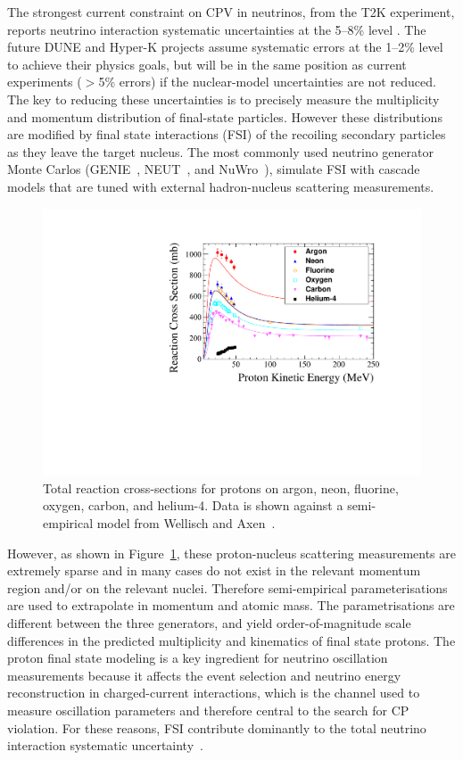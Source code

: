 The strongest current constraint on CPV in neutrinos, from the T2K experiment, reports neutrino interaction systematic uncertainties at the 5--8\% level \cite{Abe:2018wpn}.
The future DUNE and Hyper-K projects assume systematic errors at the 1--2\% level to achieve their physics goals, but will be in the same position as current experiments ($>$5\% errors) if the nuclear-model uncertainties are not reduced.  
The key to reducing these uncertainties is to precisely measure the multiplicity and momentum distribution of final-state particles. 
However these distributions are modified by final state interactions (FSI) of the recoiling secondary particles as they leave the target nucleus.  
The most commonly used neutrino generator Monte Carlos (GENIE~\cite{Andreopoulos:2009rq}, NEUT~\cite{Hayato:2009zz}, and NuWro~\cite{GOLAN2012499}), simulate FSI with cascade models that are tuned with external hadron-nucleus scattering measurements.
\begin{figure}%
    \centering
    \includegraphics[width=12cm]{files/Figures/DataProtonCrossSections.pdf}%
    \caption{Total reaction cross-sections for protons on  argon, neon, fluorine, oxygen, carbon, and helium-4. Data is shown against a semi-empirical model from Wellisch and Axen~\cite{wellisch1996total}.}
    \label{fig:DataProtonXSec}%
\end{figure}

However, as shown in Figure~\ref{fig:DataProtonXSec}, these proton-nucleus scattering measurements are extremely sparse and in many cases do not exist in the relevant momentum region and/or on the relevant nuclei.
Therefore semi-empirical parameterisations are used to extrapolate in momentum and atomic mass.  
The parametrisations are different between the three generators, and yield order-of-magnitude scale differences in the predicted multiplicity and kinematics of final state protons.
The proton final state modeling is a key ingredient for neutrino oscillation measurements because it affects the event selection and neutrino energy reconstruction in charged-current interactions, which is the channel used to measure oscillation parameters and therefore central to the search for CP violation.  
For these reasons, FSI contribute dominantly to the total neutrino interaction systematic uncertainty~\cite{Abe:2018wpn}.

